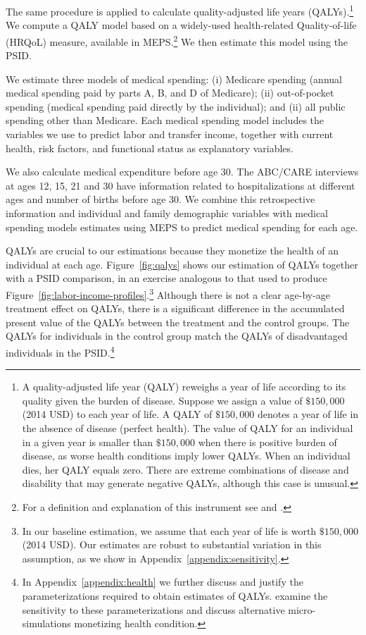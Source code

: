 The same procedure is applied to calculate quality-adjusted life years (QALYs).\footnote{A quality-adjusted life year (QALY) reweighs a year of life according to its quality given the burden of disease. Suppose we assign a value of $\$150,000$ (2014 USD) to each year of life. A QALY of $\$150,000$ denotes a year of life in the absence of disease (perfect health). The value of QALY for an individual in a given year is smaller than $\$150,000$ when there is positive burden of disease, as worse health conditions imply lower QALYs. When an individual dies, her QALY equals zero. There are extreme combinations of disease and disability that may generate negative QALYs, although this case is unusual.} We compute a QALY model based on a widely-used health-related Quality-of-life (HRQoL) measure, available in MEPS.\footnote{For a definition and explanation of this instrument see \citet{Shaw_etal_2005_EQ5D_MC} and \citet{Dolan_1997_Modeling_MC}.} We then estimate this model using the PSID.

We estimate three models of medical spending: (i) Medicare spending (annual medical spending paid by parts A, B, and D of Medicare); (ii) out-of-pocket spending (medical spending paid directly by the individual); and (ii) all public spending other than Medicare. Each medical spending model includes the variables we use to predict labor and transfer income, together with current health, risk factors, and functional status as explanatory variables.

We also calculate medical expenditure before age 30. The ABC/CARE interviews at ages 12, 15, 21 and 30 have information related to hospitalizations at different ages and number of births before age 30. We combine this retrospective information and individual and family demographic variables with medical spending models estimates using MEPS to predict medical spending for each age.

QALYs are crucial to our estimations because they monetize the health of an individual at each age. Figure~\ref{fig:qalys} shows our estimation of QALYs together with a PSID comparison, in an exercise analogous to that used to produce Figure~\ref{fig:labor-income-profiles}.\footnote{In our baseline estimation, we assume that each year of life is worth  $\$150,000$ (2014 USD). Our estimates are robust to substantial variation in this assumption, as we show in Appendix~\ref{appendix:sensitivity}.} Although there is not a clear age-by-age treatment effect on QALYs, there is a significant difference in the accumulated present value of the QALYs between the treatment and the control groups. The QALYs for individuals in the control group match the QALYs of disadvantaged individuals in the PSID.\footnote{In Appendix~\ref{appendix:health} we further discuss and justify the parameterizations required to obtain estimates of QALYs. \citet{Goldman_etal_2015_Future-America-Model} examine the sensitivity to these parameterizations and discuss alternative micro-simulations monetizing health condition.}

